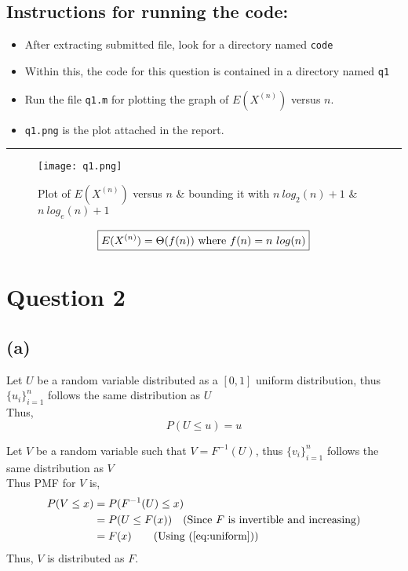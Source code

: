 \documentclass[11pt, fleqn]{article}
\begin{document}
\subsection*{Instructions for running the code:}
\begin{itemize}[itemsep=-0.6ex]
    \item After extracting submitted file, look for a directory named \texttt{code}
    \item Within this, the code for this question is contained in a directory named \texttt{q1}
    \item Run the file \texttt{q1.m} for plotting the graph of $E(X^{(n)})$ versus $n$.
    \item \texttt{q1.png} is the plot attached in the report.
\end{itemize}
\hrule
\begin{figure}[H]
    \centering
    \texttt{[image: q1.png]}
    \caption{Plot of $E(X^{(n)})$ versus $n$ \& bounding it with $n\  log_2 (n) + 1$ \& $n\ log_e (n) + 1$}
\end{figure}
\vspace{3em}
$$\boxed{E(X^{(n)}) = \Theta(f(n))$ where $f(n) = n\ log(n)}$$


\newpage
\section*{Question 2}
\setcounter{equation}{0}

\subsection*{(a)}
Let $U$ be a random variable distributed as a $[0,1]$ uniform distribution, thus $\{u_i\}^{n}_{i=1}$ follows the same distribution as $U$\\
Thus,
\begin{equation}
    \label{eq:uniform}
     P(U \le u) = u 
\end{equation}

Let $V$ be a random variable such that $V = F^{-1}(U)$, thus $\{v_i\}^{n}_{i=1}$ follows the same distribution as $V$  \\
Thus PMF for $V$ is,
$$
\begin{aligned}
    P(V \le x) &= P(F^{-1}(U) \le x)\\
    &= P(U \le F(x)) \hspace{1em} \text{(Since $F$ is invertible and increasing)}\\
    &= F(x) \hspace{2em} \text{(Using (\ref{eq:uniform}))}
\end{aligned}
$$
Thus, $V$ is distributed as $F$.
\end{document}
